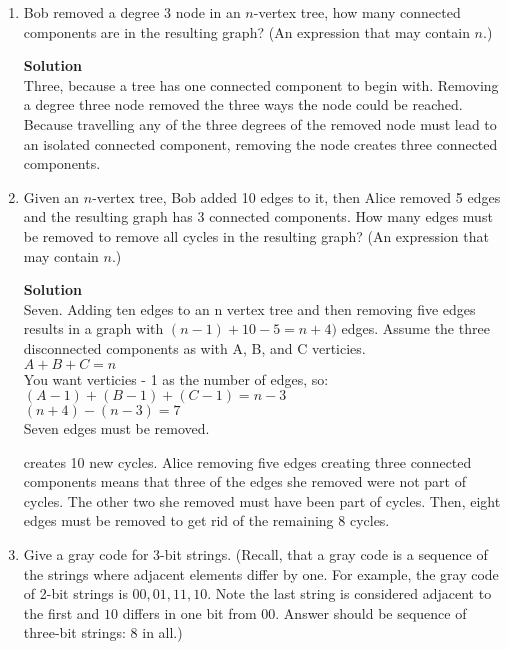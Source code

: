 \documentclass[11pt]{article}
\newenvironment{Parts}{\begin{enumerate}[label=(\alph*)]}{\end{enumerate}}
\newcommand*{\Part}{\item}
\begin{document}
\begin{Parts}

\Part
Bob removed a degree $3$ node in an $n$-vertex tree, how many connected
components are in the resulting graph?  (An expression that may
contain $n$.)

\begin{mdframed} \textbf{Solution} \\
Three, because a tree has one connected component to begin with. Removing a degree three node removed the three ways the node could be reached. Because travelling any of the three degrees of the removed node must lead to an isolated connected component, removing the node creates three connected components.
\end{mdframed}

\Part
Given an $n$-vertex tree, Bob added 10 edges to it, then Alice removed 
5 edges and the resulting graph has 3 connected components.
How many edges must be removed to remove all cycles
in the resulting graph? (An expression that may contain $n$.)

\begin{mdframed} \textbf{Solution} \\
Seven. Adding ten edges to an n vertex tree and then removing five edges results in a graph with $(n - 1) + 10 - 5 = n + 4)$ edges. Assume the three disconnected components as with A, B, and C verticies. \\
$A + B + C = n$ \\
You want verticies - 1 as the number of edges, so: \\
$(A - 1) + (B - 1) + (C - 1) = n - 3$ \\ 
$(n + 4) - (n - 3) = 7$ \\
Seven edges must be removed. 


creates 10 new cycles. Alice removing five edges creating three connected components means that three of the edges she removed were not part of cycles. The other two she removed must have been part of cycles. Then, eight edges must be removed to get rid of the remaining 8 cycles. 
\end{mdframed}

\Part
Give a gray code for 3-bit strings. (Recall, that a gray code is a
sequence of the strings where adjacent elements differ by one.  For
example, the gray code of 2-bit strings is $00,01,11,10$.  Note the
last string is considered adjacent to the first and $10$ differs in
one bit from $00$. Answer should be sequence of three-bit strings: 8
in all.)


\end{Parts}
\end{document}
